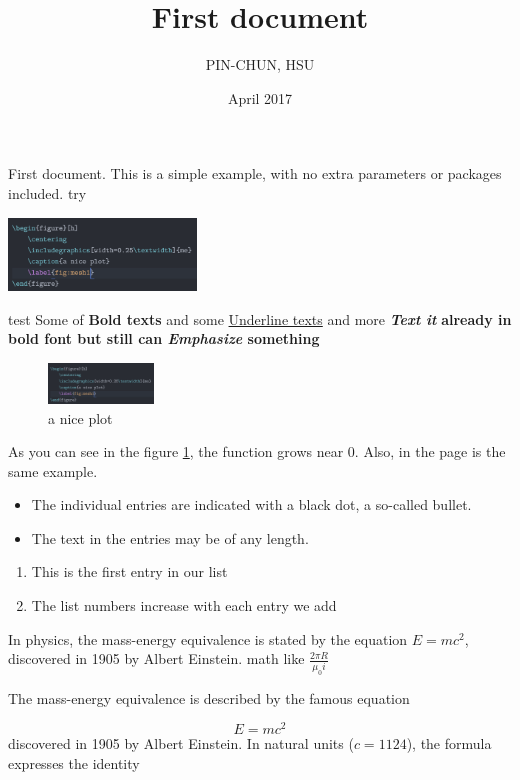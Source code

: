 \documentclass[12pt, a4paper]{article}
\title{First document}
\author{PIN-CHUN, HSU}
\date{April 2017}
\begin{document}
\maketitle

First document. This is a simple example, with no
extra parameters or packages included. %
try

\includegraphics[width=50mm,scale=0.5]{tmp}

test
Some of \textbf{Bold texts}
and some \underline{Underline texts}
and more \textbf{\textit{Text it}}
\textbf{ already in bold font but still can \emph{Emphasize} something}

\begin{figure}[h]
    \centering
    \includegraphics[width=0.25\textwidth]{tmp}
    \caption{a nice plot}
    \label{fig:mesh1}
\end{figure}

As you can see in the figure \ref{fig:mesh1}, the
function grows near 0. Also, in the page \pageref{fig:mesh1}
is the same example.

\begin{itemize}
  \item The individual entries are indicated with a black dot, a so-called bullet.
  \item The text in the entries may be of any length.
\end{itemize}

\begin{enumerate}
  \item This is the first entry in our list
  \item The list numbers increase with each entry we add
\end{enumerate}

In physics, the mass-energy equivalence is stated
by the equation $E=mc^2$, discovered in 1905 by Albert Einstein.
math like $\frac{2 \pi R}{\mu_0 i}$

The mass-energy equivalence is described by the famous equation

$$E=mc^2$$
discovered in 1905 by Albert Einstein.
In natural units ($c = 1124$), the formula expresses the identity
\end{document}

